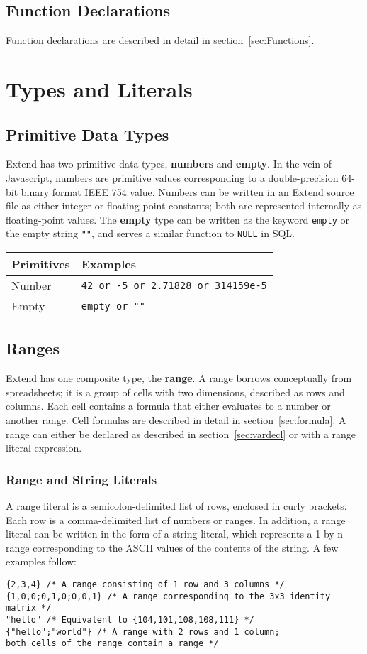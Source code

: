 	\subsection{Function Declarations}
		Function declarations are described in detail in section~\ref{sec:Functions}.
\section{Types and Literals}
	\subsection{Primitive Data Types}
		Extend has two primitive data types, \textbf{numbers} and \textbf{empty}. In the vein of Javascript, numbers are primitive values corresponding to a double-precision 64-bit binary format IEEE 754 value. Numbers can be written in an Extend source file as either integer or floating point constants; both are represented internally as floating-point values. The \textbf{empty} type can be written as the keyword \texttt{empty} or the empty string \texttt{""}, and serves a similar function to \texttt{NULL} in SQL.
		\newline
		\begin{table}[H]
		\centering
		\begin{tabular} {| l | l |}
			\hline
			\textbf{Primitives} & \textbf{Examples} \\ \hline
			Number & \texttt{42 or -5 or 2.71828 or 314159e-5} \\ \hline
			Empty & \texttt{empty or ""} \\ \hline
		\end{tabular}
		\end{table}
	\subsection{Ranges}
		Extend has one composite type, the \textbf{range}. A range borrows conceptually from spreadsheets; it is a group of cells with two dimensions, described as rows and columns. Each cell contains a formula that either evaluates to a number or another range. Cell formulas are described in detail in section~\ref{sec:formula}. A range can either be declared as described in section~\ref{sec:vardecl} or with a range literal expression.
\subsubsection{Range and String Literals}
		A range literal is a semicolon-delimited list of rows, enclosed in curly brackets. Each row is a comma-delimited list of numbers or ranges. In addition, a range literal can be written in the form of a string literal, which represents a 1-by-n range corresponding to the ASCII values of the contents of the string. A few examples follow: 
		
\begin{lstlisting}
{2,3,4} /* A range consisting of 1 row and 3 columns */
{1,0,0;0,1,0;0,0,1} /* A range corresponding to the 3x3 identity matrix */
"hello" /* Equivalent to {104,101,108,108,111} */
{"hello";"world"} /* A range with 2 rows and 1 column; 
both cells of the range contain a range */
\end{lstlisting}

